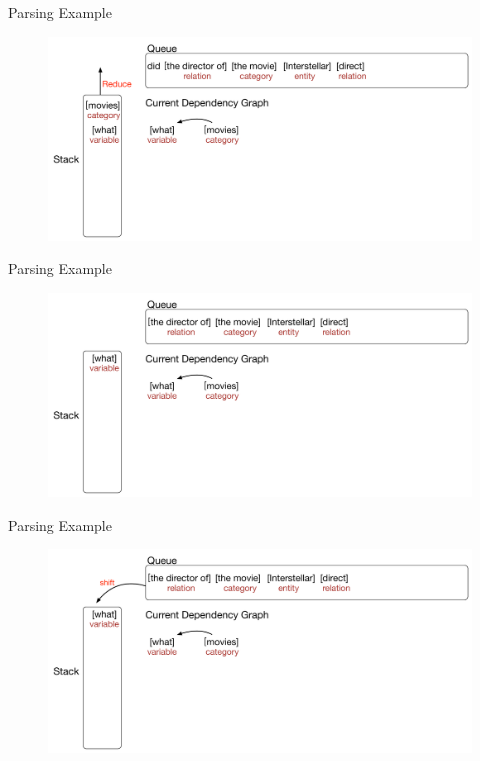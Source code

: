 \documentclass{beamer}
\begin{document}
\begin{frame}{Parsing Example}
	\begin{figure}
		\centering\includegraphics[width=1.0\textwidth]{introduction/parsing_examples/11.pdf}
	\end{figure}	
\end{frame}

\begin{frame}{Parsing Example}
	\begin{figure}
		\centering\includegraphics[width=1.0\textwidth]{introduction/parsing_examples/12.pdf}
	\end{figure}	
\end{frame}

\begin{frame}{Parsing Example}
	\begin{figure}
		\centering\includegraphics[width=1.0\textwidth]{introduction/parsing_examples/13.pdf}
	\end{figure}	
\end{frame}
\end{document}
